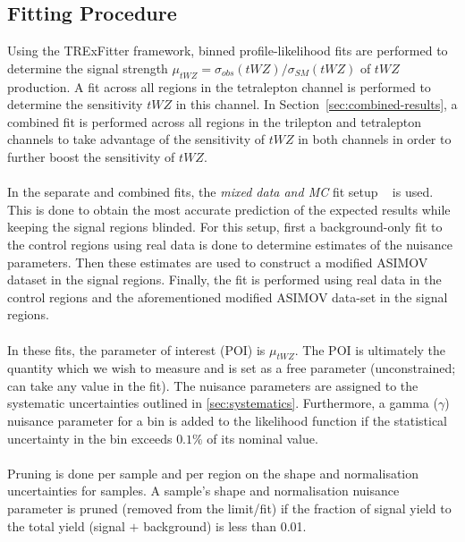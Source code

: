 \subsection{Fitting Procedure}

Using the TRExFitter framework, binned profile-likelihood fits are performed to determine the signal strength $\mu_{tWZ} = \sigma_{obs}(tWZ)/\sigma_{SM}(tWZ)$ of $tWZ$ production. A fit across all regions in the tetralepton channel is performed to determine the sensitivity $tWZ$ in this channel. In Section~\ref{sec:combined-results}, a combined fit is performed across all regions in the trilepton and tetralepton channels to take advantage of the sensitivity of $tWZ$ in both channels in order to further boost the sensitivity of $tWZ$.\\\\

In the separate and combined fits, the \textit{mixed data and MC} fit setup ~\cite{MixedDataAndMC_TRF} is used. This is done to obtain the most accurate prediction of the expected results while keeping the signal regions blinded. For this setup, first a background-only fit to the control regions using real data is done to determine estimates of the nuisance parameters. Then these estimates are used to construct a modified ASIMOV dataset in the signal regions. Finally, the fit is performed using real data in the control regions and the aforementioned modified ASIMOV data-set in the signal regions.\\\\

In these fits, the parameter of interest (POI) is $\mu_{tWZ}$. The POI is ultimately the quantity which we wish to measure and is set as a free parameter (unconstrained; can take any value in the fit). The nuisance parameters are assigned to the systematic uncertainties outlined in \ref{sec:systematics}. Furthermore, a gamma ($\gamma$) nuisance parameter for a bin is added to the likelihood function if the statistical uncertainty in the bin exceeds $0.1\%$ of its nominal value.\\\\

Pruning is done per sample and per region on the shape and normalisation uncertainties for samples. A sample's shape and normalisation nuisance parameter is pruned (removed from the limit/fit) if the fraction of signal yield to the total yield (signal $+$ background) is less than 0.01.\\\\


